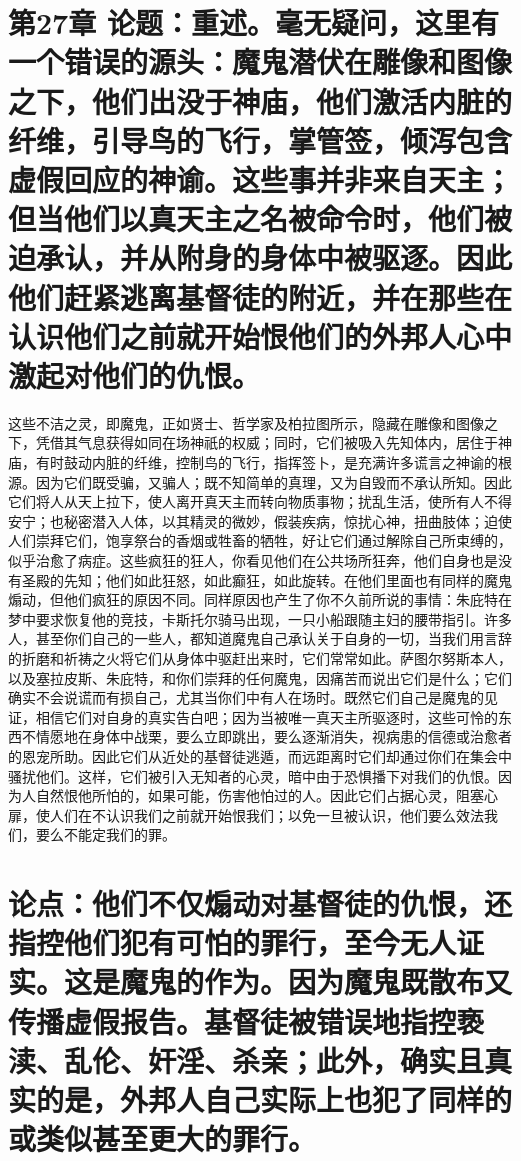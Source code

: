 \section{第27章 论题：重述。毫无疑问，这里有一个错误的源头：魔鬼潜伏在雕像和图像之下，他们出没于神庙，他们激活内脏的纤维，引导鸟的飞行，掌管签，倾泻包含虚假回应的神谕。这些事并非来自天主；但当他们以真天主之名被命令时，他们被迫承认，并从附身的身体中被驱逐。因此他们赶紧逃离基督徒的附近，并在那些在认识他们之前就开始恨他们的外邦人心中激起对他们的仇恨。}

这些不洁之灵，即魔鬼，正如贤士、哲学家及柏拉图所示，隐藏在雕像和图像之下，凭借其气息获得如同在场神祇的权威；同时，它们被吸入先知体内，居住于神庙，有时鼓动内脏的纤维，控制鸟的飞行，指挥签卜，是充满许多谎言之神谕的根源。因为它们既受骗，又骗人；既不知简单的真理，又为自毁而不承认所知。因此它们将人从天上拉下，使人离开真天主而转向物质事物；扰乱生活，使所有人不得安宁；也秘密潜入人体，以其精灵的微妙，假装疾病，惊扰心神，扭曲肢体；迫使人们崇拜它们，饱享祭台的香烟或牲畜的牺牲，好让它们通过解除自己所束缚的，似乎治愈了病症。这些疯狂的狂人，你看见他们在公共场所狂奔，他们自身也是没有圣殿的先知；他们如此狂怒，如此癫狂，如此旋转。在他们里面也有同样的魔鬼煽动，但他们疯狂的原因不同。同样原因也产生了你不久前所说的事情：朱庇特在梦中要求恢复他的竞技，卡斯托尔骑马出现，一只小船跟随主妇的腰带指引。许多人，甚至你们自己的一些人，都知道魔鬼自己承认关于自身的一切，当我们用言辞的折磨和祈祷之火将它们从身体中驱赶出来时，它们常常如此。萨图尔努斯本人，以及塞拉皮斯、朱庇特，和你们崇拜的任何魔鬼，因痛苦而说出它们是什么；它们确实不会说谎而有损自己，尤其当你们中有人在场时。既然它们自己是魔鬼的见证，相信它们对自身的真实告白吧；因为当被唯一真天主所驱逐时，这些可怜的东西不情愿地在身体中战栗，要么立即跳出，要么逐渐消失，视病患的信德或治愈者的恩宠所助。因此它们从近处的基督徒逃遁，而远距离时它们却通过你们在集会中骚扰他们。这样，它们被引入无知者的心灵，暗中由于恐惧播下对我们的仇恨。因为人自然恨他所怕的，如果可能，伤害他怕过的人。因此它们占据心灵，阻塞心扉，使人们在不认识我们之前就开始恨我们；以免一旦被认识，他们要么效法我们，要么不能定我们的罪。\par


\section{论点：他们不仅煽动对基督徒的仇恨，还指控他们犯有可怕的罪行，至今无人证实。这是魔鬼的作为。因为魔鬼既散布又传播虚假报告。基督徒被错误地指控亵渎、乱伦、奸淫、杀亲；此外，确实且真实的是，外邦人自己实际上也犯了同样的或类似甚至更大的罪行。}

